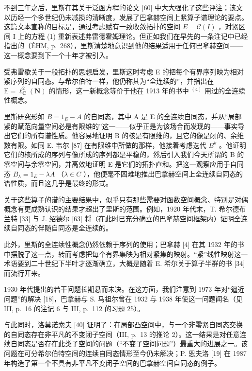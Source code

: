 
不到三年之后，里斯在其关于泛函方程的论文 [60] 中大大强化了这些评注；该文以历经一个多世纪仍未减损的清晰度，发展了巴拿赫空间上紧算子谱理论的要点。这篇文本宣称的目标是，通过考虑赋有一致收敛拓扑的空间 \(E = \mathcal{C}(I)\) ，对紧区间 I 上的方程 (1) 重新表述弗雷德霍姆理论。但正如我们在早先的一条注记中已经指出的（ÉHM, p.~268），里斯清楚地意识到他的结果适用于任何巴拿赫空间——这一概念要到下一个十年才被引入。

受弗雷歇关于一般拓扑的思想启发，里斯这时考虑 E 的把每个有界序列映为相对紧序列的自同态。与希尔伯特一样，他仍称其为“全连续的”，并指出在 \(\mathrm{E} = \ell_{\mathbf{C}}^{2}(\mathbf{N})\) 的情形，这一新概念等价于他在 1913 年的书中 \(^{(4)}\) 用过的全连续性概念。

里斯研究形如 \(B = 1_{E} - A\) 的自同态，其中 A 是 E 的全连续自同态，并从“局部紧的赋范向量空间必是有限维的”这一——似乎正是为该场合而发现的——事实导出它们的所有谱性质。他容易地证明 B 的核是有限维的，且它的像是闭的、余维数有限。如同 E. 韦尔 [87] 在有限维中所做的那样，他接着考虑迭代 \(B^{k}\) 。他证明它们的核所成的序列与像所成的序列都是平稳的，然后引入我们今天所谓的 B 的零空间与余零空间，并高效地证明 E 是它们的拓扑直和。把这一观察应用于自同态 \(B_{\lambda} = 1_{E} - \lambda A\) （\(\lambda \in C\) ），他便毫不困难地推出巴拿赫空间上全连续自同态的谱性质，而且这几乎是最终的形式。

关于这些算子的谱的主要结果中，似乎只有那些需要对函数空间概念、特别是对偶概念有更成熟认识的结果才超出了里斯的范围。例如，1920 年代末，T. 希尔德布兰特 [33] 与 J. 绍德尔 [63] 将（在此时已充分确立的巴拿赫空间框架内）证明全连续自同态的伴随自同态是全连续的。

此外，里斯的全连续性概念仍然依赖于序列的使用；巴拿赫 [4] 在其 1932 年的书中摆脱了这一点，转而考虑把每个有界集映为相对紧集的映射。“紧”线性映射这一术语要到二十世纪下半叶才逐渐确立，大概是随着 E. 希尔关于算子半群的书 [34] 而流行开来。

1930 年代提出的若干问题长期悬而未决。在这方面，我们注意到 1973 年对“逼近问题”的解决 [18]，巴拿赫与 S. 马祖尔曾在 1932 与 1938 年使这一问题闻名（见 III, p.~16 的注记 6 与 III, p.~112 的习题 25）。

与此同时，洛莫诺索夫 [40] 证明了：在局部凸空间中，与一个非零紧自同态交换的自同态存在非平凡的不变闭子空间（III, p.~13 的推论 2）。这一结果是对任意连续自同态是否存在此类子空间的问题（“不变子空间问题”）最重大的进展之一。该问题在可分希尔伯特空间的连续自同态情形至今仍未解决；P. 恩夫洛 [19] 在 1987 年构造了第一个不具有非平凡不变闭子空间的巴拿赫空间自同态的例子。
\relax{}
